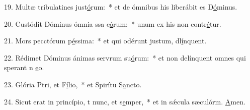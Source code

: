 19. Multæ tribulatines just\uline{ó}rum:~* et de ómnibus his liberábit es D\uline{ó}minus.\par 
20. Custódit Dóminus ómnia ssa e\uline{ó}rum:~* unum ex his non contr\uline{é}tur.\par 
21. Mors pecctórum p\uline{é}ssima:~* et qui odérunt justum, dl\uline{í}nquent.\par 
22. Rédimet Dóminus ánimas servrum su\uline{ó}rum:~* et non delínquent omnes qui sperant n \uline{e}o.\par 
23. Glória Ptri, et F\uline{í}lio,~* et Spirítu S\uline{a}ncto.\par 
24. Sicut erat in princípio, t nunc, et s\uline{e}mper,~* et in sǽcula sæculórm. \uline{A}men.\par 
